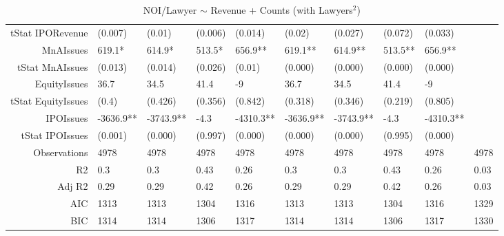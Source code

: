 \begin{table}[ht]
\begin{tabular}{rlllllllll}
  tStat IPORevenue & (0.007) & (0.01) & (0.006) & (0.014) & (0.02) & (0.027) & (0.072) & (0.033) &  \\ 
  MnAIssues & 619.1* & 614.9* & 513.5* & 656.9** & 619.1** & 614.9** & 513.5** & 656.9** &  \\ 
  tStat MnAIssues & (0.013) & (0.014) & (0.026) & (0.01) & (0.000) & (0.000) & (0.000) & (0.000) &  \\ 
  EquityIssues & 36.7 & 34.5 & 41.4 & -9 & 36.7 & 34.5 & 41.4 & -9 &  \\ 
  tStat EquityIssues & (0.4) & (0.426) & (0.356) & (0.842) & (0.318) & (0.346) & (0.219) & (0.805) &  \\ 
  IPOIssues & -3636.9** & -3743.9** & -4.3 & -4310.3** & -3636.9** & -3743.9** & -4.3 & -4310.3** &  \\ 
  tStat IPOIssues & (0.001) & (0.000) & (0.997) & (0.000) & (0.000) & (0.000) & (0.995) & (0.000) &  \\ 
  Observations & 4978 & 4978 & 4978 & 4978 & 4978 & 4978 & 4978 & 4978 & 4978 \\ 
  R2 & 0.3 & 0.3 & 0.43 & 0.26 & 0.3 & 0.3 & 0.43 & 0.26 & 0.03 \\ 
  Adj R2 & 0.29 & 0.29 & 0.42 & 0.26 & 0.29 & 0.29 & 0.42 & 0.26 & 0.03 \\ 
  AIC & 1313 & 1313 & 1304 & 1316 & 1313 & 1313 & 1304 & 1316 & 1329 \\ 
  BIC & 1314 & 1314 & 1306 & 1317 & 1314 & 1314 & 1306 & 1317 & 1330 \\ 
   \hline
\end{tabular}
\caption{NOI/Lawyer $\sim$ Revenue + Counts (with Lawyers$^2$)} 
\end{table}
